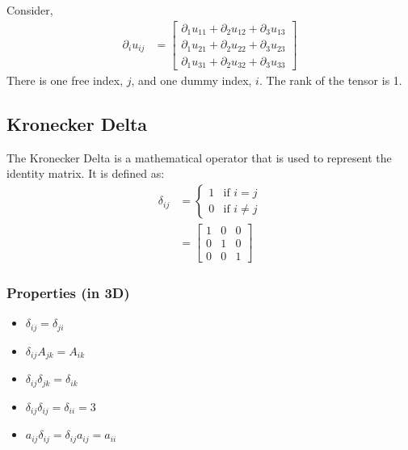 
Consider, 
\begin{align*}
    \partial_i u_{ij} &= \begin{bmatrix}
        \partial_1 u_{11} + \partial_2 u_{12} + \partial_3 u_{13} \\
        \partial_1 u_{21} + \partial_2 u_{22} + \partial_3 u_{23} \\
        \partial_1 u_{31} + \partial_2 u_{32} + \partial_3 u_{33}
    \end{bmatrix}
\end{align*}
There is one free index, $j$, and one dummy index, $i$. The rank of the tensor is 1.

\subsection{Kronecker Delta}
The Kronecker Delta is a mathematical operator that is used to represent the identity matrix. It is defined as:
\begin{align*}
    \delta_{ij} &= 
    \begin{cases}
        1 & \text{if } i = j \\
        0 & \text{if } i \neq j
    \end{cases} \\
    &=
    \begin{bmatrix}
        1 & 0 & 0 \\
        0 & 1 & 0 \\
        0 & 0 & 1
    \end{bmatrix}
\end{align*}

\subsubsection{Properties (in 3D)}
\begin{itemize}
    \item $\delta_{ij} = \delta_{ji}$
    \item $\delta_{ij}A_{jk} = A_{ik}$
    \item $\delta_{ij}\delta_{jk} = \delta_{ik}$
    \item $\delta_{ij}\delta_{ij} = \delta_{ii} = 3$
    \item $a_{ij} \delta_{ij} = \delta_{ij} a_{ij} = a_{ii}$
\end{itemize}


